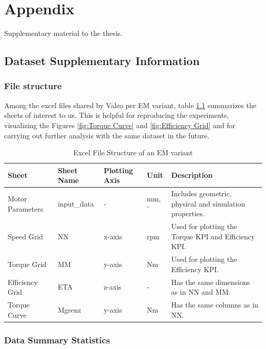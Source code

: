 \documentclass{report} %
\begin{document}
\newpage 

\appendix
\chapter{Appendix}
Supplementary material to the thesis.

\section{Dataset Supplementary Information}
\label{sec:Dataset Supplementary Information}
\subsection{File structure}
\label{subsec:File structure}
Among the excel files shared by Valeo per \ac{EM} variant, table \ref{tab:Excel File Structure} summarizes the sheets of interest to us.
This is helpful for reproducing the experiments, visualizing the Figures \ref{fig:Torque Curve} and \ref{fig:Efficiency Grid} and for carrying out further analysis 
with the same dataset in the future.

\begin{table}[H]
    \centering
    \begin{tabular}{|p{1.7cm}|p{1.5cm}|p{1.3cm}|p{.7cm}|p{8.3cm}|}
    \hline
    {\bf Sheet} & {\bf Sheet Name} & {\bf Plotting Axis} & {\bf Unit} &  {\bf Description}\\
    \hline
    Motor Parameters & input\_data & - & mm, $^\circ$ & Includes geometric, physical and simulation properties.\\
    Speed Grid & NN & x-axis & rpm & Used for plotting the Torque \ac{KPI} and Efficiency \ac{KPI}.\\
    Torque Grid & MM & y-axis & Nm & Used for plotting the Efficiency \ac{KPI}.\\
    Efficiency Grid & ETA & z-axis & - & Has the same dimensions as in NN and MM. \\
    Torque Curve & Mgrenz & y-axis & Nm & Has the same columns as in NN. \\
    \hline
    \end{tabular}
    \caption{Excel File Structure of an \ac{EM} variant}
    \label{tab:Excel File Structure}
\end{table}

\subsection{Data Summary Statistics}
\label{subsec:Data Summary Statistics}
\end{document}
